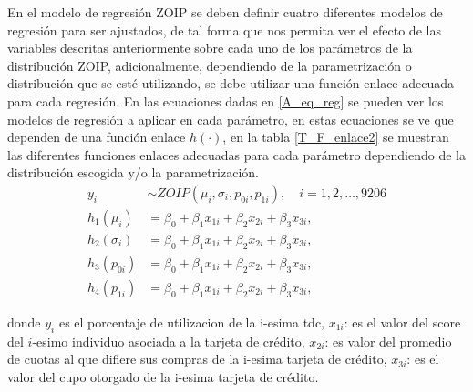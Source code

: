 En el modelo de regresi\'{o}n ZOIP se deben definir cuatro diferentes modelos de regresi\'{o}n para ser ajustados, de tal forma que nos permita ver el efecto de las variables descritas anteriormente sobre cada uno de los par\'{a}metros de la distribuci\'{o}n ZOIP, adicionalmente, dependiendo de la parametrizaci\'{o}n o distribuci\'{o}n que se est\'{e} utilizando, se debe utilizar una funci\'{o}n enlace adecuada para cada regresi\'{o}n. En las ecuaciones dadas en \eqref{A_eq_reg} se pueden ver los modelos de regresi\'{o}n a aplicar en cada par\'{a}metro, en estas ecuaciones se ve que dependen de una funci\'{o}n enlace $h(\cdot)$, en la tabla \ref{T_F_enlace2} se muestran las diferentes funciones enlaces adecuadas para cada par\'{a}metro dependiendo de la distribuci\'{o}n escogida y/o la parametrizaci\'{o}n.
\begin{equation}
\begin{split}
y_{i} & \sim ZOIP(\mu_{i},\sigma_{i},p_{0i}, p_{1i}), \quad i=1,2, \ldots, 9206\\
h_1(\mu_{i}) &=\beta_0+\beta_1 x_{1i}+\beta_2 x_{2i}+\beta_3 x_{3i},\\
h_2(\sigma_{i}) &=\beta_0+\beta_1 x_{1i}+\beta_2 x_{2i}+\beta_3 x_{3i},\\
h_3(p_{0i}) &=\beta_0+\beta_1 x_{1i}+\beta_2 x_{2i}+\beta_3 x_{3i},\\
h_4(p_{1i}) &=\beta_0+\beta_1 x_{1i}+\beta_2 x_{2i}+\beta_3 x_{3i},
\end{split}
\label{A_eq_reg}
\end{equation}

donde $y_i$ es el porcentaje de utilizacion de la i-esima tdc, $x_{1i}$: es el valor del score del $i$-esimo individuo asociada a la tarjeta de cr\'{e}dito, $x_{2i}$: es valor del promedio de cuotas al que difiere sus compras de la i-esima tarjeta de cr\'{e}dito, $x_{3i}$: es el valor del cupo otorgado de la i-esima tarjeta de cr\'{e}dito. 

